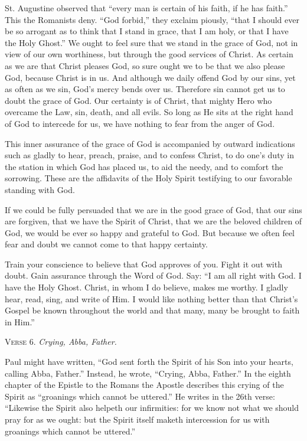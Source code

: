 St. Augustine observed that “every man is certain of his faith, if he has faith.” This the Romanists deny. “God forbid,” they exclaim piously, “that I should ever be so arrogant as to think that I stand in grace, that I am holy, or that I have the Holy Ghost.” We ought to feel sure that we stand in the grace of God, not in view of our own worthiness, but through the good services of Christ. As certain as we are that Christ pleases God, so sure ought we to be that we also please God, because Christ is in us. And although we daily offend God by our sins, yet as often as we sin, God’s mercy bends over us. Therefore sin cannot get us to doubt the grace of God. Our certainty is of Christ, that mighty Hero who overcame the Law, sin, death, and all evils. So long as He sits at the right hand of God to intercede for us, we have nothing to fear from the anger of God.

This inner assurance of the grace of God is accompanied by outward indications such as gladly to hear, preach, praise, and to confess Christ, to do one’s duty in the station in which God has placed us, to aid the needy, and to comfort the sorrowing. These are the affidavits of the Holy Spirit testifying to our favorable standing with God.

If we could be fully persuaded that we are in the good grace of God, that our sins are forgiven, that we have the Spirit of Christ, that we are the beloved children of God, we would be ever so happy and grateful to God. But because we often feel fear and doubt we cannot come to that happy certainty.

Train your conscience to believe that God approves of you. Fight it out with doubt. Gain assurance through the Word of God. Say: “I am all right with God. I have the Holy Ghost. Christ, in whom I do believe, makes me worthy. I gladly hear, read, sing, and write of Him. I would like nothing better than that Christ’s Gospel be known throughout the world and that many, many be brought to faith in Him.”

\textsc{Verse} 6. \emph{Crying, Abba, Father.}

Paul might have written, “God sent forth the Spirit of his Son into your hearts, calling Abba, Father.” Instead, he wrote, “Crying, Abba, Father.” In the eighth chapter of the Epistle to the Romans the Apostle describes this crying of the Spirit as “groanings which cannot be uttered.” He writes in the 26th verse: “Likewise the Spirit also helpeth our infirmities: for we know not what we should pray for as we ought: but the Spirit itself maketh intercession for us with groanings which cannot be uttered.”

